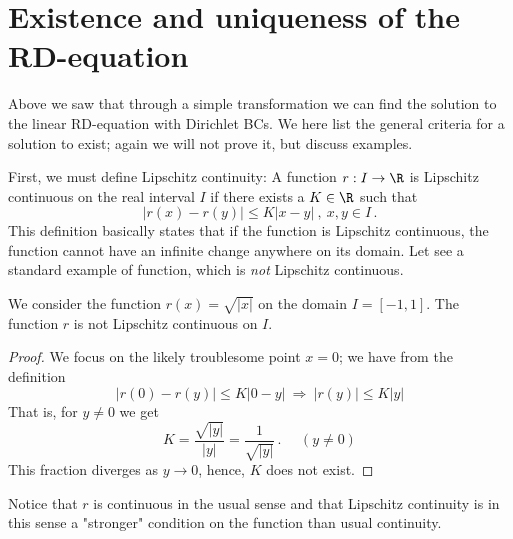 \section{Existence and uniqueness of the RD-equation}
Above we saw that through a simple transformation we can find the solution to the
linear RD-equation with Dirichlet BCs. We here list the general criteria for a solution to
exist; again we will not prove it, but discuss examples. 

First, we must define Lipschitz continuity: 
A function $r: I \rightarrow \R$ is Lipschitz continuous on the real interval $I$
if there exists a $K \in \R$ such that
\begin{equation}
  |r(x)-r(y)| \leq K |x-y| \ , \ x,y \in I \, .
\end{equation}
This definition basically states that if the function is Lipschitz continuous, the function 
cannot have an infinite change anywhere on its domain. Let see a standard example of 
function, which is \emph{not} Lipschitz continuous.

\begin{example}
	We consider the function $r(x) = \sqrt{|x|}$ on the domain $I=[-1,1]$. 
	The function $r$ is not Lipschitz continuous on $I$.

	\begin{proof}
		We focus on the likely troublesome point $x=0$; we have from the definition
		\begin{equation}
		    |r(0)-r(y)| \leq K |0-y| \ \Rightarrow \ |r(y)| \leq K|y|
		  \end{equation}
		That is, for $y \neq 0$ we get 
		\begin{equation}
		    K =\frac{\sqrt{|y|}}{|y|} = \frac{1}{\sqrt{|y|}} \, . \ \ \ \ \ \ (y \neq 0) 
		\end{equation}
		This fraction diverges as $y \rightarrow 0$, hence, $K$ does not exist. 
	\end{proof}

	\noindent Notice that $r$ is continuous in the usual sense and that Lipschitz continuity 
	is in this sense a "stronger" condition on the function than usual continuity. 
\end{example}

